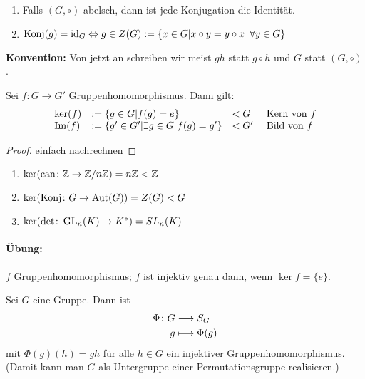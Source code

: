 \documentclass[12pt,a4paper]{scrartcl}
\begin{document}
\begin{bem}
	\leavevmode
	\begin{enumerate}
		\item 	Falls $(G,\circ)$ abelsch, dann ist jede Konjugation die Identität.
		\item $\operatorname{Konj}(g) = \text{id}_G \Leftrightarrow g\in Z(G):=\{x\in G|x\circ y = y\circ x\enspace \forall y\in G\}$
	\end{enumerate}
\end{bem}

\noindent\textbf{Konvention:} Von jetzt an schreiben wir meist $gh$ statt $g\circ h$ und $G$ statt $(G,\circ)$.

\begin{satz} \label{thm:kerim_g}
	Sei $f\colon G\to G'$ Gruppenhomomorphismus. Dann gilt:	
	\begin{equation*}
	\begin{array}{llll}
		\operatorname{ker}(f) & := \{g\in G|f(g) = e\}                  & <G & \mbox{ Kern von }f\\
		\operatorname{Im}(f)  & := \{g'\in G'|\exists g\in G\ f(g)=g'\} & <G'& \text{ Bild von }f
	\end{array}
	\end{equation*}
\end{satz}

\begin{proof}
	einfach nachrechnen
\end{proof}
\begin{bsp}
	\leavevmode
	\begin{enumerate}
		\item $\operatorname{ker}(\text{can}\colon \mathbb Z\to \mathbb Z/n\mathbb Z) = n\mathbb Z<\mathbb Z$
		\item $\operatorname{ker}(\operatorname{Konj}\colon G\to \operatorname{Aut}(G)) = Z(G)<G$
		\item $\operatorname{ker}(\det\colon \operatorname{GL}_n(K)\to K^*) = SL_n(K)$
	\end{enumerate}
\end{bsp}

\paragraph{Übung:} $f$ Gruppenhomomorphismus; $f$ ist injektiv genau dann, wenn $\ker f = \{e\}$.

\begin{satz} \label{thm:cayley}
	Sei $G$ eine Gruppe. Dann ist
	\begin{align*}
		\Phi \colon G&\longrightarrow S_G\\
		g&\longmapsto \Phi(g)
	\end{align*} mit $\Phi(g)(h) = gh$ für alle $h\in G$ ein injektiver Gruppenhomomorphismus. \textup(Damit kann man $G$ als Untergruppe einer Permutationsgruppe \glqq realisieren\grqq.\textup)
\end{satz}
\end{document}
